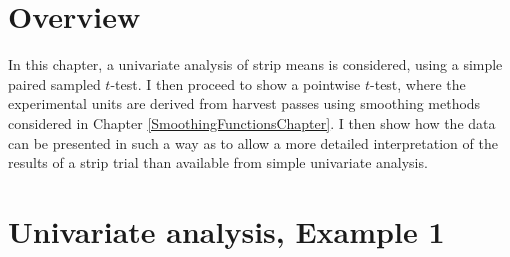 \documentclass[phdcss]{SDSUThesis}
\begin{document}
\section{Overview}

In this chapter, a univariate analysis of strip means is considered, using a simple paired sampled $t$-test. I then proceed to show a pointwise $t$-test, where the experimental units are derived from harvest passes using smoothing methods considered in Chapter \ref{SmoothingFunctionsChapter}. I then show how the data can be presented in such a way as to allow a more detailed interpretation of the results of a strip trial than available from simple univariate analysis.

\section{Univariate analysis, Example 1}
\end{document}
